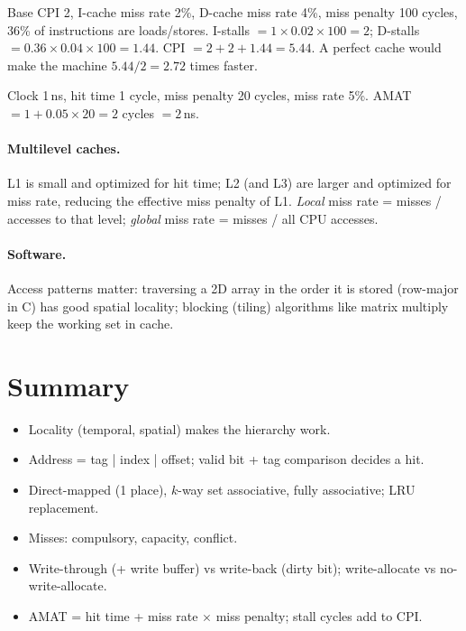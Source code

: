 \begin{example}
Base CPI 2, I-cache miss rate 2\%, D-cache miss rate 4\%, miss penalty 100
cycles, 36\% of instructions are loads/stores.
I-stalls $= 1 \times 0.02 \times 100 = 2$;
D-stalls $= 0.36 \times 0.04 \times 100 = 1.44$.
CPI $= 2 + 2 + 1.44 = 5.44$. A perfect cache would make the machine
$5.44/2 = 2.72$ times faster.
\end{example}

\begin{example}[AMAT]
Clock 1\,ns, hit time 1 cycle, miss penalty 20 cycles, miss rate 5\%.
AMAT $= 1 + 0.05 \times 20 = 2$ cycles $= 2$\,ns.
\end{example}

\paragraph{Multilevel caches.} L1 is small and optimized for hit time; L2
(and L3) are larger and optimized for miss rate, reducing the effective miss
penalty of L1. \emph{Local} miss rate = misses / accesses to that level;
\emph{global} miss rate = misses / all CPU accesses.

\paragraph{Software.} Access patterns matter: traversing a 2D array in the
order it is stored (row-major in C) has good spatial locality; blocking
(tiling) algorithms like matrix multiply keep the working set in cache.

\section*{Summary}
\begin{itemize}
  \item Locality (temporal, spatial) makes the hierarchy work.
  \item Address = tag | index | offset; valid bit + tag comparison decides
    a hit.
  \item Direct-mapped (1 place), $k$-way set associative, fully
    associative; LRU replacement.
  \item Misses: compulsory, capacity, conflict.
  \item Write-through (+ write buffer) vs write-back (dirty bit);
    write-allocate vs no-write-allocate.
  \item AMAT = hit time + miss rate $\times$ miss penalty; stall cycles add
    to CPI.
\end{itemize}
